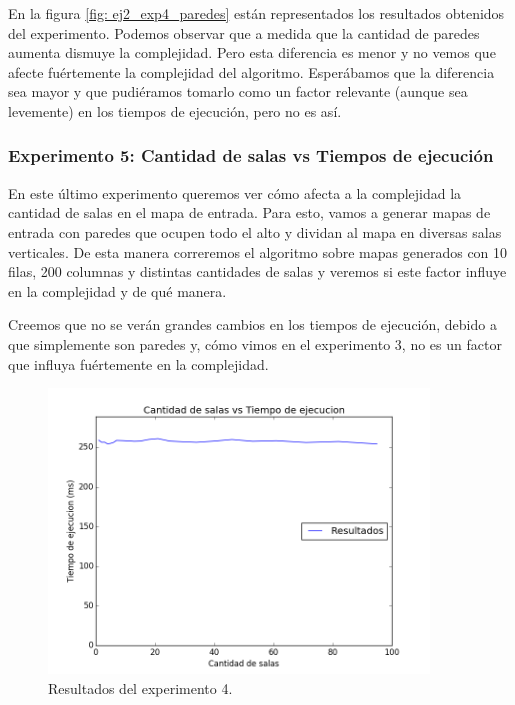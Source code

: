 \par En la figura \ref{fig: ej2_exp4_paredes} están representados los resultados obtenidos del experimento. Podemos observar que a medida que la cantidad de paredes aumenta dismuye la complejidad. Pero esta diferencia es menor y no vemos que afecte fuértemente la complejidad del algoritmo. Esperábamos que la diferencia sea mayor y que pudiéramos tomarlo como un factor relevante (aunque sea levemente) en los tiempos de ejecución, pero no es así.

\subsubsection{Experimento 5: Cantidad de salas vs Tiempos de ejecución}

\par En este último experimento queremos ver cómo afecta a la complejidad la cantidad de salas en el mapa de entrada. Para esto, vamos a generar mapas de entrada con paredes que ocupen todo el alto y dividan al mapa en diversas salas verticales. De esta manera correremos el algoritmo sobre mapas generados con 10 filas, 200 columnas y distintas cantidades de salas y veremos si este factor influye en la complejidad y de qué manera.

\par Creemos que no se verán grandes cambios en los tiempos de ejecución, debido a que simplemente son paredes y, cómo vimos en el experimento 3, no es un factor que influya fuértemente en la complejidad.

\begin{figure}[H]
  \centering
  \includegraphics[width=0.9\textwidth]{Problema2/img/exp5_salas.png}
  \caption{Resultados del experimento 4.}
  \label{fig: ej2_exp5_salas}
\end{figure}

